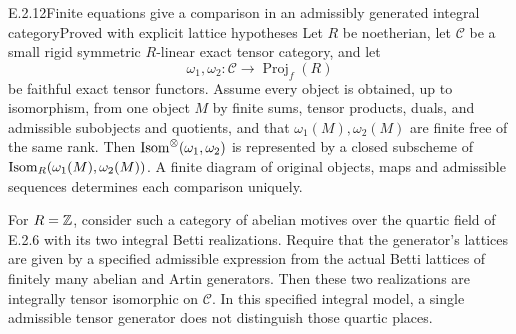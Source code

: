 \begin{result}{E.2.12}{Finite equations give a comparison in an admissibly generated integral category}{Proved with explicit lattice hypotheses}
Let $R$ be noetherian, let $\mathcal C$ be a small rigid symmetric
$R$-linear exact tensor category, and let
\[
 \omega_1,\omega_2:\mathcal C\longrightarrow\operatorname{Proj}_f(R)
\]
be faithful exact tensor functors. Assume every object is obtained,
up to isomorphism, from one object $M$ by finite sums, tensor products,
duals, and admissible subobjects and quotients, and that
$\omega_1(M),\omega_2(M)$ are finite free of the same rank.
Then $\operatorname{Isom}^\otimes(\omega_1,\omega_2)$ is represented by a closed
subscheme of $\operatorname{Isom}_R(\omega_1(M),\omega_2(M))$. A finite diagram of
original objects, maps and admissible sequences determines each
comparison uniquely.

For $R=\mathbb Z$, consider such a category of abelian motives over the
quartic field of E.2.6 with its two integral Betti realizations.
Require that the generator's lattices are given by a specified
admissible expression from the actual Betti lattices of finitely
many abelian and Artin generators. Then these two realizations
are integrally tensor isomorphic on $\mathcal C$. In this
specified integral model, a single admissible tensor generator
does not distinguish those quartic places.
\end{result}
